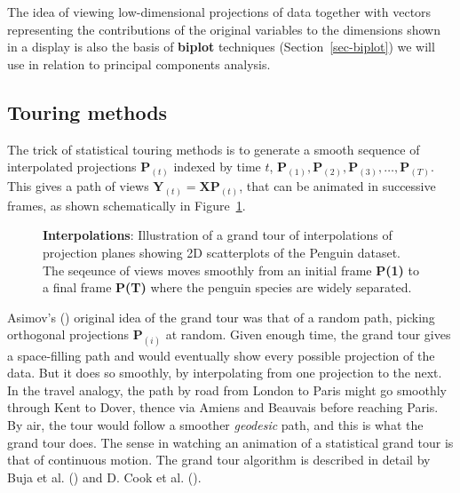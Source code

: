 \documentclass[
  letterpaper,
  10pt,
  krantz2]{krantz}
\begin{document}
The idea of viewing low-dimensional projections of data together with
vectors representing the contributions of the original variables to the
dimensions shown in a display is also the basis of \textbf{biplot}
techniques (Section~\ref{sec-biplot}) we will use in relation to
principal components analysis.

\subsection{Touring methods}\label{touring-methods}

The trick of statistical touring methods is to generate a smooth
sequence of interpolated projections \(\mathbf{P}_{(t)}\) indexed by
time \(t\),
\(\mathbf{P}_{(1)}, \mathbf{P}_{(2)}, \mathbf{P}_{(3)}, \dots, \mathbf{P}_{(T)}\).
This gives a path of views
\(\mathbf{Y}_{(t)} = \mathbf{X} \mathbf{P}_{(t)}\), that can be animated
in successive frames, as shown schematically in
Figure~\ref{fig-peng-tourr-diagram}.

\begin{figure}


\caption{\label{fig-peng-tourr-diagram}\textbf{Interpolations}:
Illustration of a grand tour of interpolations of projection planes
showing 2D scatterplots of the Penguin dataset. The seqeunce of views
moves smoothly from an initial frame \textbf{P(1)} to a final frame
\textbf{P(T)} where the penguin species are widely separated.}

\end{figure}%

Asimov's () original idea of the grand
tour was that of a random path, picking orthogonal projections
\(\mathbf{P}_{(i)}\) at random. Given enough time, the grand tour gives
a space-filling path and would eventually show every possible projection
of the data. But it does so smoothly, by interpolating from one
projection to the next. In the travel analogy, the path by road from
London to Paris might go smoothly through Kent to Dover, thence via
Amiens and Beauvais before reaching Paris. By air, the tour would follow
a smoother \emph{geodesic} path, and this is what the grand tour does.
The sense in watching an animation of a statistical grand tour is that
of continuous motion. The grand tour algorithm is described in detail by
Buja et al. () and D. Cook et al.
().
\end{document}
